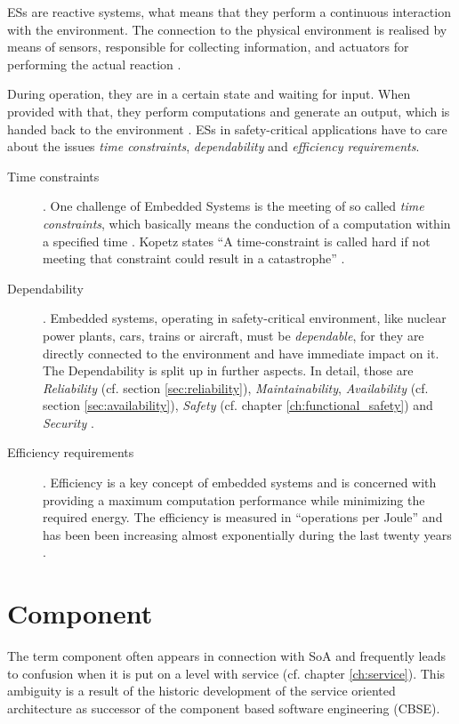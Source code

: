 ESs are reactive systems, what means that they perform a continuous interaction with the environment. The connection to the physical environment is realised by means of sensors, responsible for collecting information, and actuators for performing the actual reaction \cite[p.8-9]{marwedel}. 

During operation, they are in a certain state and waiting for input. When provided with that, they perform computations and generate an output, which is handed back to the environment \cite[p.9]{marwedel}. ESs in safety-critical applications have to care about the issues \emph{time constraints}, \emph{dependability} and \emph{efficiency requirements}.

\begin{description}
	\item [Time constraints].
	One challenge of Embedded Systems is the meeting of so called \emph{time constraints}, which basically means the conduction of a computation within a specified time \cite[p.8-9]{marwedel} \cite{rodrigues2011}. Kopetz states ``A time-constraint is called hard if not meeting that constraint could result in a catastrophe'' \cite{kopetz}.
	\item [Dependability].
	Embedded systems, operating in safety-critical environment, like nuclear power plants, cars, trains or aircraft, must be \emph{dependable}, for they are directly connected to the environment and have immediate impact on it. The Dependability is split up in further aspects. In detail, those are \emph{Reliability} (cf. section \ref{sec:reliability}), \emph{Maintainability}, \emph{Availability} (cf. section \ref{sec:availability}), \emph{Safety} (cf. chapter \ref{ch:functional_safety}) and \emph{Security} \cite[p.4-5]{marwedel}.
	\item [Efficiency requirements].
	Efficiency is a key concept of embedded systems and is concerned with providing a maximum computation performance while minimizing the required energy. The efficiency is measured in ``operations per Joule'' and has been been increasing almost exponentially during the last twenty years \cite{marwedel}.
\end{description}






\section{Component}
\label{ch:component}

The term component often appears in connection with SoA and frequently leads to confusion when it is put on a level with service (cf. chapter \ref{ch:service}). This ambiguity is a result of the historic development of the service oriented architecture as successor of the component based software engineering (CBSE).

